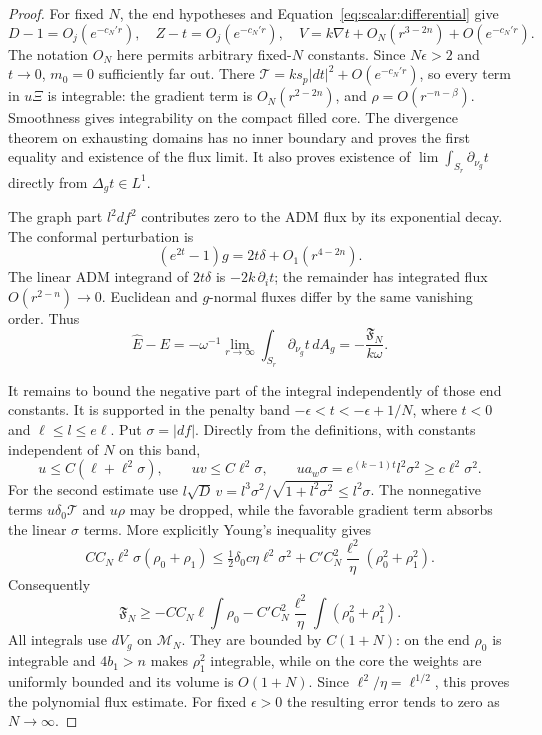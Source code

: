 \begin{proof}
For fixed $N$, the end hypotheses and
Equation~\eqref{eq:scalar:differential} give
\[
 D-1=O_j(e^{-c_N'r}),\quad Z-t=O_j(e^{-c_N'r}),\quad
 V=k\nabla t+O_N(r^{3-2n})+O(e^{-c_N'r}).
\]
The notation $O_N$ here permits arbitrary fixed-$N$ constants.
Since $N\epsilon>2$ and $t\to0$, $m_0=0$ sufficiently far out.
There $\mathcal T=ks_p|dt|^2+O(e^{-c_N'r})$, so every term in
$u\Xi$ is integrable: the gradient term is $O_N(r^{2-2n})$, and
$\rho=O(r^{-n-\beta})$.  Smoothness gives integrability on the compact
filled core.  The divergence theorem on exhausting domains has no
inner boundary and proves the first equality and existence of the
flux limit.  It also proves existence of $\lim\int_{S_r}\partial_{\nu_g}t$
directly from $\Delta_gt\in L^1$.

The graph part $l^2df^2$ contributes zero to the ADM flux by its
exponential decay.  The conformal perturbation is
\[
 (e^{2t}-1)g=2t\delta+O_1(r^{4-2n}).
\]
The linear ADM integrand of $2t\delta$ is $-2k\,\partial_i t$;
the remainder has integrated flux $O(r^{2-n})\to0$.  Euclidean and
$g$-normal fluxes differ by the same vanishing order.  Thus
\[
 \widehat E-E=-\omega^{-1}\lim_{r\to\infty}
                      \int_{S_r}\partial_{\nu_g}t\,dA_g
                =-\frac{\mathfrak F_N}{k\omega}.
\]

It remains to bound the negative part of the integral independently
of those end constants.  It is supported in the penalty band
$-\epsilon<t<-\epsilon+1/N$, where $t<0$ and
$\ell\leq l\leq e\ell$.  Put $\sigma=|df|$.  Directly from the
definitions, with constants independent of $N$ on this band,
\begin{equation}
 u\leq C(\ell+\ell^2\sigma),\qquad
 uv\leq C\ell^2\sigma,\qquad
 ua_w\sigma=e^{(k-1)t}l^2\sigma^2\geq c\ell^2\sigma^2.
 \label{eq:scalar:penalty-weights}
\end{equation}
For the second estimate use
$l\sqrt D\,v=l^3\sigma^2/\sqrt{1+l^2\sigma^2}\leq l^2\sigma$.
The nonnegative terms $u\delta_0\mathcal T$ and $u\rho$ may be
dropped, while the favorable gradient term absorbs the linear
$\sigma$ terms.  More explicitly Young's inequality gives
\[
 C C_N\ell^2\sigma(\rho_0+\rho_1)
 \leq\tfrac12\delta_0c\eta\ell^2\sigma^2
       +C' C_N^2\frac{\ell^2}{\eta}(\rho_0^2+\rho_1^2).
\]
Consequently
\[
 \mathfrak F_N\geq
  -C C_N\ell\int\rho_0
  -C' C_N^2\frac{\ell^2}{\eta}\int(\rho_0^2+\rho_1^2).
\]
All integrals use $dV_g$ on $\mathcal M_N$.  They are bounded by
$C(1+N)$: on the end $\rho_0$ is integrable and $4b_1>n$ makes
$\rho_1^2$ integrable, while on the core the weights are uniformly
bounded and its volume is $O(1+N)$.  Since
$\ell^2/\eta=\ell^{1/2}$, this proves the polynomial flux estimate.
For fixed $\epsilon>0$ the resulting error tends to zero as
$N\to\infty$.
\end{proof}

